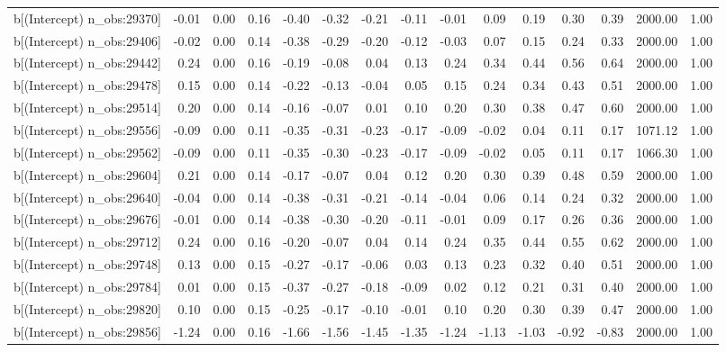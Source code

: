 \begin{table}[ht]
\begin{tabular}{rrrrrrrrrrrrrrr}
  b[(Intercept) n\_obs:29370] & -0.01 & 0.00 & 0.16 & -0.40 & -0.32 & -0.21 & -0.11 & -0.01 & 0.09 & 0.19 & 0.30 & 0.39 & 2000.00 & 1.00 \\ 
  b[(Intercept) n\_obs:29406] & -0.02 & 0.00 & 0.14 & -0.38 & -0.29 & -0.20 & -0.12 & -0.03 & 0.07 & 0.15 & 0.24 & 0.33 & 2000.00 & 1.00 \\ 
  b[(Intercept) n\_obs:29442] & 0.24 & 0.00 & 0.16 & -0.19 & -0.08 & 0.04 & 0.13 & 0.24 & 0.34 & 0.44 & 0.56 & 0.64 & 2000.00 & 1.00 \\ 
  b[(Intercept) n\_obs:29478] & 0.15 & 0.00 & 0.14 & -0.22 & -0.13 & -0.04 & 0.05 & 0.15 & 0.24 & 0.34 & 0.43 & 0.51 & 2000.00 & 1.00 \\ 
  b[(Intercept) n\_obs:29514] & 0.20 & 0.00 & 0.14 & -0.16 & -0.07 & 0.01 & 0.10 & 0.20 & 0.30 & 0.38 & 0.47 & 0.60 & 2000.00 & 1.00 \\ 
  b[(Intercept) n\_obs:29556] & -0.09 & 0.00 & 0.11 & -0.35 & -0.31 & -0.23 & -0.17 & -0.09 & -0.02 & 0.04 & 0.11 & 0.17 & 1071.12 & 1.00 \\ 
  b[(Intercept) n\_obs:29562] & -0.09 & 0.00 & 0.11 & -0.35 & -0.30 & -0.23 & -0.17 & -0.09 & -0.02 & 0.05 & 0.11 & 0.17 & 1066.30 & 1.00 \\ 
  b[(Intercept) n\_obs:29604] & 0.21 & 0.00 & 0.14 & -0.17 & -0.07 & 0.04 & 0.12 & 0.20 & 0.30 & 0.39 & 0.48 & 0.59 & 2000.00 & 1.00 \\ 
  b[(Intercept) n\_obs:29640] & -0.04 & 0.00 & 0.14 & -0.38 & -0.31 & -0.21 & -0.14 & -0.04 & 0.06 & 0.14 & 0.24 & 0.32 & 2000.00 & 1.00 \\ 
  b[(Intercept) n\_obs:29676] & -0.01 & 0.00 & 0.14 & -0.38 & -0.30 & -0.20 & -0.11 & -0.01 & 0.09 & 0.17 & 0.26 & 0.36 & 2000.00 & 1.00 \\ 
  b[(Intercept) n\_obs:29712] & 0.24 & 0.00 & 0.16 & -0.20 & -0.07 & 0.04 & 0.14 & 0.24 & 0.35 & 0.44 & 0.55 & 0.62 & 2000.00 & 1.00 \\ 
  b[(Intercept) n\_obs:29748] & 0.13 & 0.00 & 0.15 & -0.27 & -0.17 & -0.06 & 0.03 & 0.13 & 0.23 & 0.32 & 0.40 & 0.51 & 2000.00 & 1.00 \\ 
  b[(Intercept) n\_obs:29784] & 0.01 & 0.00 & 0.15 & -0.37 & -0.27 & -0.18 & -0.09 & 0.02 & 0.12 & 0.21 & 0.31 & 0.40 & 2000.00 & 1.00 \\ 
  b[(Intercept) n\_obs:29820] & 0.10 & 0.00 & 0.15 & -0.25 & -0.17 & -0.10 & -0.01 & 0.10 & 0.20 & 0.30 & 0.39 & 0.47 & 2000.00 & 1.00 \\ 
  b[(Intercept) n\_obs:29856] & -1.24 & 0.00 & 0.16 & -1.66 & -1.56 & -1.45 & -1.35 & -1.24 & -1.13 & -1.03 & -0.92 & -0.83 & 2000.00 & 1.00 \\ 

\end{tabular}
\end{table}
